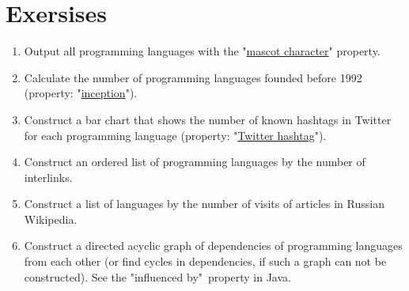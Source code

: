 \section{Exersises}
\begin{enumerate}
\item Output all programming languages with the "\href{https://www.wikidata.org/wiki/Property:P822}{mascot character}" property.
\item Calculate the number of programming languages founded before 1992 (property: "\href{https://www.wikidata.org/wiki/Property:P571}{inception}").
\item Construct a bar chart that shows the number of known hashtags in Twitter for each programming language (property: "\href{https://www.wikidata.org/wiki/Property:P2572}{Twitter hashtag}").
\item Construct an ordered list of programming languages by the number of interlinks.
\item Construct a list of languages by the number of visits of articles in Russian Wikipedia.
\item Construct a directed acyclic graph of dependencies of programming languages from each other (or find cycles in dependencies, if such a graph can not be constructed). See the "influenced by"\  property in Java.
\end{enumerate}